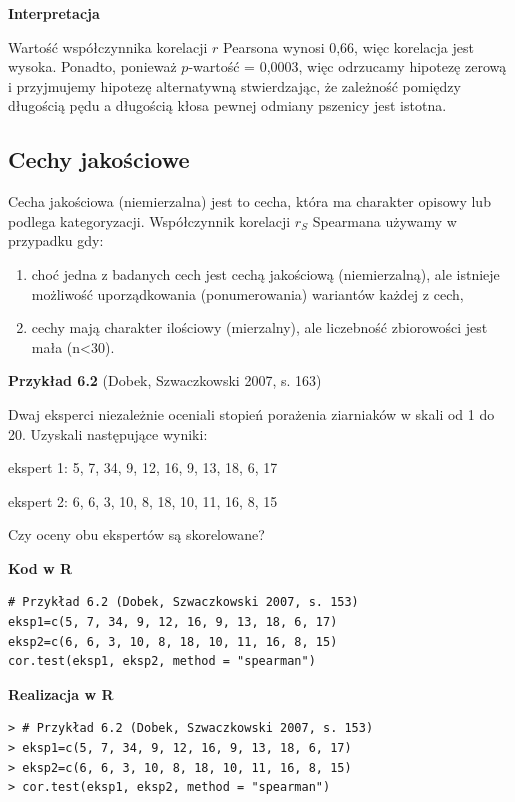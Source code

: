 \documentclass[12pt,B5paper,]{book}
\begin{document}
\vspace{0.8cm} \textbf{Interpretacja}

Wartość współczynnika korelacji \(r\) Pearsona wynosi 0,66, więc
korelacja jest wysoka. Ponadto, ponieważ \(p\)-wartość = 0,0003, więc
odrzucamy hipotezę zerową i przyjmujemy hipotezę alternatywną
stwierdzając, że zależność pomiędzy długością pędu a długością kłosa
pewnej odmiany pszenicy jest istotna.

\subsection{Cechy jakościowe}\label{cechy-jakosciowe}

Cecha jakościowa (niemierzalna) jest to cecha, która ma charakter
opisowy lub podlega kategoryzacji. Współczynnik korelacji \(r_S\)
Spearmana używamy w przypadku gdy:

\begin{enumerate}
\def\labelenumi{\arabic{enumi}.}
\item
  choć jedna z badanych cech jest cechą jakościową (niemierzalną), ale
  istnieje możliwość uporządkowania (ponumerowania) wariantów każdej z
  cech,
\item
  cechy mają charakter ilościowy (mierzalny), ale liczebność zbiorowości
  jest mała (n\textless{}30).
\end{enumerate}

\vspace{0.8cm} \textbf{Przykład 6.2} (Dobek, Szwaczkowski 2007, s. 163)

Dwaj eksperci niezależnie oceniali stopień porażenia ziarniaków w skali
od 1 do 20. Uzyskali następujące wyniki:

ekspert 1: 5, 7, 34, 9, 12, 16, 9, 13, 18, 6, 17

ekspert 2: 6, 6, 3, 10, 8, 18, 10, 11, 16, 8, 15

Czy oceny obu ekspertów są skorelowane?

\newpage

\textbf{Kod w R}

\begin{verbatim}
# Przykład 6.2 (Dobek, Szwaczkowski 2007, s. 153)
eksp1=c(5, 7, 34, 9, 12, 16, 9, 13, 18, 6, 17)
eksp2=c(6, 6, 3, 10, 8, 18, 10, 11, 16, 8, 15)
cor.test(eksp1, eksp2, method = "spearman")
\end{verbatim}

\vspace{0.8cm} \textbf{Realizacja w R}

\begin{verbatim}
> # Przykład 6.2 (Dobek, Szwaczkowski 2007, s. 153)
> eksp1=c(5, 7, 34, 9, 12, 16, 9, 13, 18, 6, 17)
> eksp2=c(6, 6, 3, 10, 8, 18, 10, 11, 16, 8, 15)
> cor.test(eksp1, eksp2, method = "spearman")
\end{verbatim}
\end{document}
